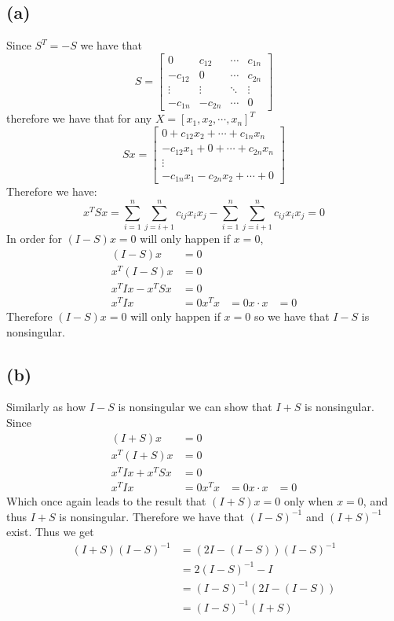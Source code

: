 \subsection*{(a)}
Since $S^T=-S$ we have that
$$S=\begin{bmatrix}
    0 & c_{12} & \cdots & c_{1n} \\
    -c_{12} & 0 & \cdots & c_{2n} \\
    \vdots & \vdots & \ddots & \vdots \\
    -c_{1n} & -c_{2n} & \cdots & 0
\end{bmatrix}$$
therefore we have that for any $X=[x_1,x_2,\cdots,x_n]^T$ 
$$Sx=\begin{bmatrix}
    0 + c_{12}x_2 + \cdots + c_{1n}x_n\\
    -c_{12}x_1 + 0 + \cdots + c_{2n}x_n\\
    \vdots \\
    -c_{1n}x_1 - c_{2n}x_2 + \cdots + 0
\end{bmatrix}$$
Therefore we have:
$$x^TSx=\sum_{i=1}^n\sum_{j=i+1}^n c_{ij}x_ix_j-\sum_{i=1}^n\sum_{j=i+1}^n c_{ij}x_ix_j=0$$
In order for $(I-S)x=0$ will only happen if $x=0$, 
\begin{align*}
    (I-S)x &= 0 \\
    x^T(I-S)x &= 0\\
    x^TIx-x^TSx &= 0\\
    x^TIx &= 0
    x^Tx&=0
    x\cdot x &= 0
\end{align*}
Therefore  $(I-S)x=0$ will only happen if $x=0$ so we have
that $I-S$ is nonsingular.
\subsection*{(b)}
Similarly as how $I-S$ is nonsingular we can show that $I+S$ is nonsingular.
Since
\begin{align*}
    (I+S)x &= 0 \\
    x^T(I+S)x &= 0\\
    x^TIx+x^TSx &= 0\\
    x^TIx &= 0
    x^Tx&=0
    x\cdot x &= 0
\end{align*}
Which once again leads to the result that $(I+S)x=0$
only when $x=0$, and thus $I+S$ is nonsingular.
Therefore we have that $(I-S)^{-1}$ and $(I+S)^{-1}$ exist.
Thus we get
\begin{align*}
    (I+S)(I-S)^{-1} &= (2I-(I-S))(I-S)^{-1} \\
    &=2(I-S)^{-1}-I\\
    &=(I-S)^{-1}(2I-(I-S))\\
    &=(I-S)^{-1}(I+S)
\end{align*}
